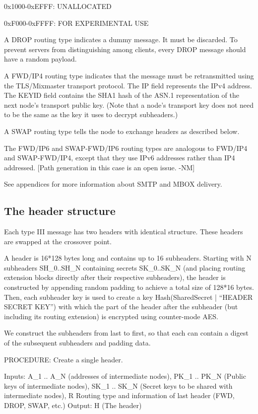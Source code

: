 0x1000-0xEFFF: UNALLOCATED

0xF000-0xFFFF: FOR EXPERIMENTAL USE

A DROP routing type indicates a dummy message. It must be discarded.
To prevent servers from distinguishing among clients, every DROP
message should have a random payload.

A FWD/IP4 routing type indicates that the message must be
retransmitted using the TLS/Mixmaster transport protocol. The IP field
represents the IPv4 address.  The KEYID field contains the SHA1 hash
of the ASN.1 representation of the next node's transport public key.
(Note that a node's transport key does not need to be the same as the
key it uses to decrypt subheaders.)

A SWAP routing type tells the node to exchange headers as described below.

The FWD/IP6 and SWAP-FWD/IP6 routing types are analogous to FWD/IP4
and SWAP-FWD/IP4, except that they use IPv6 addresses rather than IP4
addressed.  [Path generation in this case is an open issue. -NM]

See appendices for more information about SMTP and MBOX delivery.

\subsection{The header structure}

Each type III message has two headers with identical structure. These
headers are swapped at the crossover point.

A header is 16*128 bytes long and contains up to 16
subheaders. Starting with N subheaders SH_0..SH_N containing secrets
SK_0..SK_N (and placing routing extension blocks directly after their
respective subheaders), the header is constructed by appending 
random padding to achieve a total size
of 128*16 bytes. Then, each subheader key is used to create a key
Hash(SharedSecret | ``HEADER SECRET KEY'') with which the part of the
header after the subheader (but including its routing extension) is
encrypted using counter-mode AES.

We construct the subheaders from last to first, so that each can contain
a digest of the subsequent subheaders and padding data.

PROCEDURE: Create a single header.

Inputs: A_1 .. A_N (addresses of intermediate nodes), 
	PK_1 .. PK_N (Public keys of intermediate nodes),
	SK_1 .. SK_N (Secret keys to be shared with intermediate nodes),
        R Routing type and information of last header (FWD, DROP, SWAP, etc.)
Output: H (The header)

